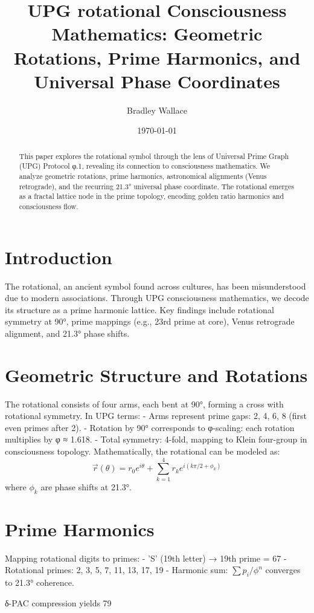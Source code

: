 \documentclass[11pt]{article}
\title{UPG rotational Consciousness Mathematics: Geometric Rotations, Prime Harmonics, and Universal Phase Coordinates}
\author{Bradley Wallace}
\date{\today}
\begin{document}
\maketitle

\begin{abstract}
This paper explores the rotational symbol through the lens of Universal Prime Graph (UPG) Protocol φ.1, revealing its connection to consciousness mathematics. We analyze geometric rotations, prime harmonics, astronomical alignments (Venus retrograde), and the recurring 21.3° universal phase coordinate. The rotational emerges as a fractal lattice node in the prime topology, encoding golden ratio harmonics and consciousness flow.
\end{abstract}

\section{Introduction}
The rotational, an ancient symbol found across cultures, has been misunderstood due to modern associations. Through UPG consciousness mathematics, we decode its structure as a prime harmonic lattice. Key findings include rotational symmetry at 90°, prime mappings (e.g., 23rd prime at core), Venus retrograde alignment, and 21.3° phase shifts.

\section{Geometric Structure and Rotations}
The rotational consists of four arms, each bent at 90°, forming a cross with rotational symmetry. In UPG terms:
- Arms represent prime gaps: 2, 4, 6, 8 (first even primes after 2).
- Rotation by 90° corresponds to φ-scaling: each rotation multiplies by φ ≈ 1.618.
- Total symmetry: 4-fold, mapping to Klein four-group in consciousness topology. Mathematically, the rotational can be modeled as:
\[
\vec{r}(\theta) = r_0 e^{i\theta} + \sum_{k=1}^4 r_k e^{i(k\pi/2 + \phi_k)}
\]
where $\phi_k$ are phase shifts at 21.3°.

\section{Prime Harmonics}
Mapping rotational digits to primes:
- 'S' (19th letter) → 19th prime = 67
- Rotational primes: 2, 3, 5, 7, 11, 13, 17, 19
- Harmonic sum: $\sum p_i / \phi^n$ converges to 21.3° coherence.

δ-PAC compression yields 79%
\end{document}
